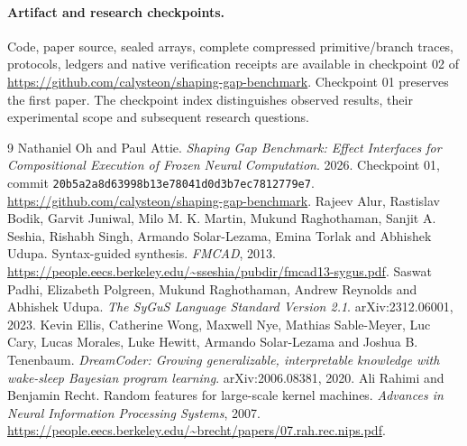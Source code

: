 \documentclass[11pt]{article}
\begin{document}
\paragraph{Artifact and research checkpoints.}
Code, paper source, sealed arrays, complete compressed primitive/branch traces,
protocols, ledgers and native verification receipts are available in checkpoint
02 of \url{https://github.com/calysteon/shaping-gap-benchmark}. Checkpoint 01
preserves the first paper. The checkpoint index distinguishes observed results,
their experimental scope and subsequent research questions.

\begin{thebibliography}{9}
 Nathaniel Oh and Paul Attie.
\emph{Shaping Gap Benchmark: Effect Interfaces for Compositional Execution of
Frozen Neural Computation}. 2026. Checkpoint 01, commit
\texttt{20b5a2a8d63998b13e78041d0d3b7ec7812779e7}.
\url{https://github.com/calysteon/shaping-gap-benchmark}.
 Rajeev Alur, Rastislav Bodik, Garvit Juniwal, Milo M. K. Martin,
Mukund Raghothaman, Sanjit A. Seshia, Rishabh Singh, Armando Solar-Lezama,
Emina Torlak and Abhishek Udupa. Syntax-guided synthesis. \emph{FMCAD}, 2013.
\url{https://people.eecs.berkeley.edu/~sseshia/pubdir/fmcad13-sygus.pdf}.
 Saswat Padhi, Elizabeth Polgreen, Mukund Raghothaman,
Andrew Reynolds and Abhishek Udupa.
\emph{The SyGuS Language Standard Version 2.1}. arXiv:2312.06001, 2023.
 Kevin Ellis, Catherine Wong, Maxwell Nye, Mathias Sable-Meyer,
Luc Cary, Lucas Morales, Luke Hewitt, Armando Solar-Lezama and Joshua B. Tenenbaum.
\emph{DreamCoder: Growing generalizable, interpretable knowledge with wake-sleep
Bayesian program learning}. arXiv:2006.08381, 2020.
 Ali Rahimi and Benjamin Recht.
Random features for large-scale kernel machines. \emph{Advances in Neural
Information Processing Systems}, 2007.
\url{https://people.eecs.berkeley.edu/~brecht/papers/07.rah.rec.nips.pdf}.
\end{thebibliography}
\end{document}
